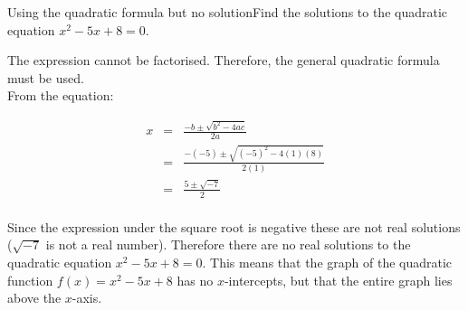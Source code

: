 \begin{wex}{Using the quadratic formula but no solution}{Find the solutions to the quadratic equation $x^{2} - 5x + 8=0$.\\}{
The expression cannot be factorised. Therefore, the general quadratic formula must be used.\\

From the equation:

\begin{eqnarray}
x & =& \frac{-b \pm \sqrt{b^{2} - 4ac}}{2a} \\
& =& \frac{-(-5) \pm \sqrt{(-5)^{2} - 4(1)(8)}}{2(1)} \\
& =& \frac{5 \pm \sqrt{-7}}{2} \\
\end{eqnarray}

Since the expression under the square root is negative these are not
real solutions ($\sqrt{-7}$ is not a real number). Therefore
there are no real solutions to the quadratic equation $x^{2} - 5x
+ 8=0$. This means that the graph of the quadratic function $f(x) = x^{2} - 5x + 8$ has no $x$-intercepts, but that the entire graph lies above the $x$-axis.}
\end{wex}

